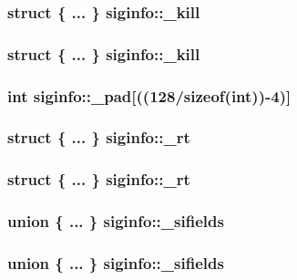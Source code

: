\subsubsection[{\_\-kill}]{\setlength{\rightskip}{0pt plus 5cm}struct \{ ... \}   {\bf siginfo::\_\-kill}}\label{structsiginfo_a907a260989869cc2b15fdc28d8cf7c62}
\subsubsection[{\_\-kill}]{\setlength{\rightskip}{0pt plus 5cm}struct \{ ... \}   {\bf siginfo::\_\-kill}}\label{structsiginfo_a39425c4cd34a2da1a19c30dd7aacc805}
\subsubsection[{\_\-pad}]{\setlength{\rightskip}{0pt plus 5cm}int {\bf siginfo::\_\-pad}[((128/sizeof(int))-\/4)]}\label{structsiginfo_a88001c4cf16f9f27c53fef986cc2eaee}
\subsubsection[{\_\-rt}]{\setlength{\rightskip}{0pt plus 5cm}struct \{ ... \}   {\bf siginfo::\_\-rt}}\label{structsiginfo_a48320a087aad89dc97d8ec2cf6624c50}
\subsubsection[{\_\-rt}]{\setlength{\rightskip}{0pt plus 5cm}struct \{ ... \}   {\bf siginfo::\_\-rt}}\label{structsiginfo_acd3bab02e8bc899bde101a9984417e50}
\subsubsection[{\_\-sifields}]{\setlength{\rightskip}{0pt plus 5cm}union \{ ... \}   {\bf siginfo::\_\-sifields}}\label{structsiginfo_a1feb4cc517c965009266429c744ea29a}
\subsubsection[{\_\-sifields}]{\setlength{\rightskip}{0pt plus 5cm}union \{ ... \}   {\bf siginfo::\_\-sifields}}\label{structsiginfo_a84fb6d3e32c1540635739866f7fc42e6}
